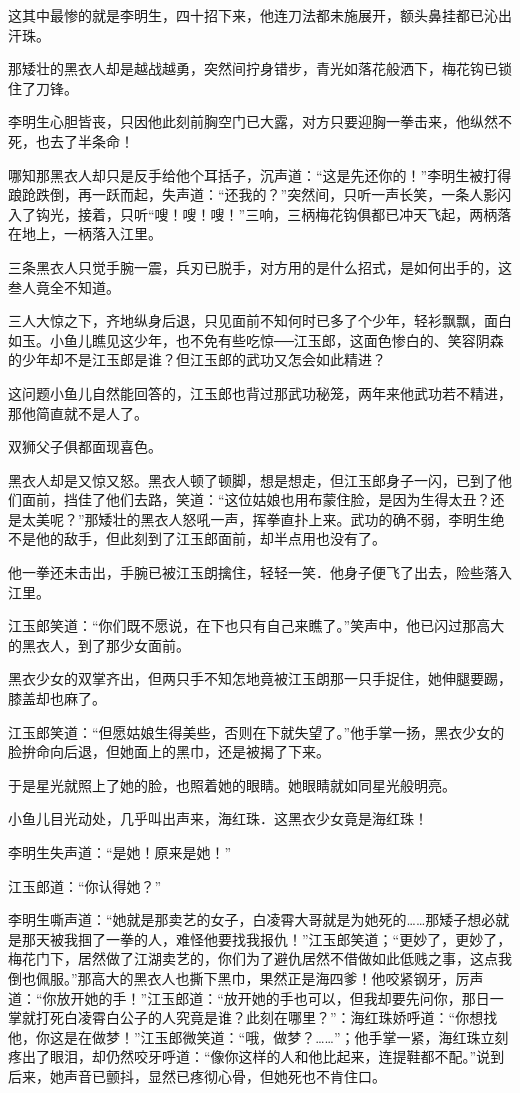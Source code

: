 \documentclass[12pt,oneside]{book}
\begin{document}
这其中最惨的就是李明生，四十招下来，他连刀法都未施展开，额头鼻挂都已沁出汗珠。

那矮壮的黑衣人却是越战越勇，突然间拧身错步，青光如落花般洒下，梅花钩已锁住了刀锋。

李明生心胆皆丧，只因他此刻前胸空门已大露，对方只要迎胸一拳击来，他纵然不死，也去了半条命！

哪知那黑衣人却只是反手给他个耳括子，沉声道：``这是先还你的！''李明生被打得踉跄跌倒，再一跃而起，失声道：``还我的？''突然间，只听一声长笑，一条人影闪入了钩光，接着，只听``嗖！嗖！嗖！''三响，三柄梅花钩俱都已冲天飞起，两柄落在地上，一柄落入江里。

三条黑衣人只觉手腕一震，兵刃已脱手，对方用的是什么招式，是如何出手的，这叁人竟全不知道。

三人大惊之下，齐地纵身后退，只见面前不知何时已多了个少年，轻衫飘飘，面白如玉。小鱼儿瞧见这少年，也不免有些吃惊──江玉郎，这面色惨白的、笑容阴森的少年却不是江玉郎是谁？但江玉郎的武功又怎会如此精进？

这问题小鱼儿自然能回答的，江玉郎也背过那武功秘笼，两年来他武功若不精进，那他简直就不是人了。

双狮父子俱都面现喜色。

黑衣人却是又惊又怒。黑衣人顿了顿脚，想是想走，但江玉郎身子一闪，已到了他们面前，挡佳了他们去路，笑道：``这位姑娘也用布蒙住脸，是因为生得太丑？还是太美呢？''那矮壮的黑衣人怒吼一声，挥拳直扑上来。武功的确不弱，李明生绝不是他的敌手，但此刻到了江玉郎面前，却半点用也没有了。

他一拳还未击出，手腕已被江玉朗擒住，轻轻一笑．他身子便飞了出去，险些落入江里。

江玉郎笑道：``你们既不愿说，在下也只有自己来瞧了。''笑声中，他已闪过那高大的黑衣人，到了那少女面前。

黑衣少女的双掌齐出，但两只手不知怎地竟被江玉朗那一只手捉住，她伸腿要踢，膝盖却也麻了。

江玉郎笑道：``但愿姑娘生得美些，否则在下就失望了。''他手掌一扬，黑衣少女的脸拚命向后退，但她面上的黑巾，还是被揭了下来。

于是星光就照上了她的脸，也照着她的眼睛。她眼睛就如同星光般明亮。

小鱼儿目光动处，几乎叫出声来，海红珠．这黑衣少女竟是海红珠！

李明生失声道：``是她！原来是她！''

江玉郎道：``你认得她？''

李明生嘶声道：``她就是那卖艺的女子，白凌霄大哥就是为她死的\ldots\ldots 那矮子想必就是那天被我掴了一拳的人，难怪他要找我报仇！''江玉郎笑道；``更妙了，更妙了，梅花门下，居然做了江湖卖艺的，你们为了避仇居然不借做如此低贱之事，这点我倒也佩服。''那高大的黑衣人也撕下黑巾，果然正是海四爹！他咬紧钢牙，厉声道：``你放开她的手！''江玉郎道：``放开她的手也可以，但我却要先问你，那日一掌就打死白凌霄白公子的人究竟是谁？此刻在哪里？''：海红珠娇呼道：``你想找他，你这是在做梦！''江玉郎微笑道：``哦，做梦？\ldots\ldots{}''；他手掌一紧，海红珠立刻疼出了眼泪，却仍然咬牙呼道：``像你这样的人和他比起来，连提鞋都不配。''说到后来，她声音已颤抖，显然已疼彻心骨，但她死也不肯住口。
\end{document}
